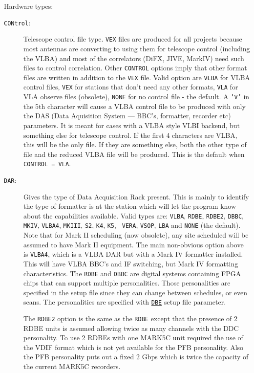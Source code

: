 \documentclass{report}
\begin{document}
Hardware types:

\begin{description}

\item [{\tt CONtrol}:] Telescope control file type. {\tt VEX} files
are produced for all projects because most antennas are converting
to using them for telescope control (including the VLBA) and most
of the correlators (DiFX, JIVE, MarkIV) need such files to control
correlation.  Other {\tt CONTROL} options imply that other format
files are written in addition to the {\tt VEX} file.  Valid option are
{\tt VLBA} for VLBA control files,
{\tt VEX} for stations that don't need any other formats,
{\tt VLA} for VLA observe files (obsolete),
{\tt NONE} for no control file - the default.
A {\tt 'V'} in the 5th character will cause a VLBA
control file to be produced with only the DAS (Data Aquisition System
--- BBC's, formatter, recorder etc) parameters.  It is meant for
cases with a VLBA style VLBI backend, but something else for telescope
control.  If the first
4 characters are VLBA, this will be the only file.  If they are
something else, both the other type of file and the reduced VLBA file
will be produced.  This is the default when {\tt CONTROL = VLA}.

\item [{\tt DAR}:] Gives the type of Data Acquisition Rack present.
This is mainly to identify the type of formatter is at the station
which will let the program know about the capabilities available.
Valid types are: {\tt VLBA}, {\tt RDBE}, {\tt RDBE2}, {\tt DBBC}, {\tt
MKIV}, {\tt VLBA4}, {\tt MKIII}, {\tt S2}, {\tt K4}, {\tt K5}, {\tt
VERA}, {\tt VSOP}, {\tt LBA} and {\tt NONE} (the default).  Note that
for Mark II scheduling (now obsolete), any site scheduled will be
assumed to have Mark II equipment.  The main non-obvious option above
is {\tt VLBA4}, which is a VLBA DAR but with a Mark IV formatter
installed. This will have VLBA BBC's and IF switching, but Mark IV
formatting characteristics.  The {\tt RDBE} and {\tt DBBC} are digital
systems containing FPGA chips that can support multiple personalities.
Those personalities are specified in the setup file since they can
change between schedules, or even scans.  The personalities are
specified with 
{\hyperref[SP:DBE]{{\tt DBE}}} setup file parameter.

The {\tt RDBE2} option is the same as the {\tt RDBE} except that
the presence of 2 RDBE units is assumed allowing twice as many 
channels with the DDC personality.  To use 2 RDBEs with one MARK5C
unit required the use of the VDIF format which is not yet available
for the PFB personality.  Also the PFB personality puts out a fixed
2 Gbps which is twice the capacity of the current MARK5C recorders.


\end{description}
\end{document}
